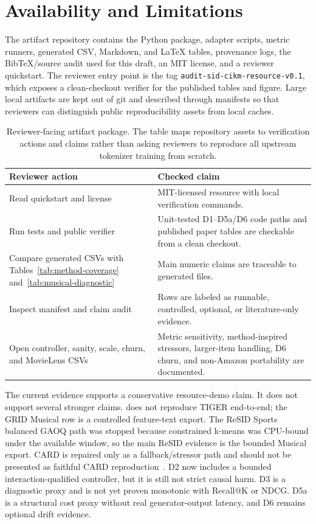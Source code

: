\section{Availability and Limitations}

The artifact repository contains the \tool Python package, adapter scripts,
metric runners, generated CSV, Markdown, and \LaTeX{} tables, provenance logs,
the BibTeX/source audit used for this draft, an MIT license, and a reviewer
quickstart. The reviewer entry point is the tag
\texttt{audit-sid-cikm-resource-v0.1}, which exposes a clean-checkout verifier
for the published tables and figure. Large local artifacts are kept out of git
and described through manifests so that reviewers can distinguish public
reproducibility assets from local caches.

\begin{table}[t]
\caption{Reviewer-facing artifact package. The table maps repository assets to
verification actions and claims rather than asking reviewers to reproduce all
upstream tokenizer training from scratch.}
\label{tab:artifact-package}
\small
\setlength{\tabcolsep}{3pt}
\begin{tabularx}{\columnwidth}{@{}p{}Y@{}}
\toprule
Reviewer action & Checked claim \\
\midrule
Read quickstart and license & MIT-licensed resource with local verification
commands. \\
Run tests and public verifier & Unit-tested D1--D5a/D6 code paths and published
paper tables are checkable from a clean checkout. \\
Compare generated CSVs with Tables~\ref{tab:method-coverage}
and~\ref{tab:musical-diagnostic} & Main numeric claims are traceable to
generated files. \\
Inspect manifest and claim audit & Rows are labeled as runnable, controlled,
optional, or literature-only evidence. \\
Open controller, sanity, scale, churn, and MovieLens CSVs & Metric sensitivity,
method-inspired stressors, larger-item handling, D6 churn, and non-Amazon
portability are documented. \\
\bottomrule
\end{tabularx}
\end{table}

The current evidence supports a conservative resource-demo claim. It does not
support several stronger claims. \tool does not reproduce TIGER end-to-end; the
GRID Musical row is a controlled feature-text export. The ReSID Sports balanced
GAOQ path was stopped because constrained k-means was CPU-bound under the
available window, so the main ReSID evidence is the bounded Musical export.
CARD is repaired only as a fallback/stressor path and should not be presented
as faithful CARD reproduction~\cite{wei2026card}. D2 now includes a bounded
interaction-qualified controller, but it is still not strict causal harm. D3 is
a diagnostic proxy and is not yet proven monotonic with Recall@K or NDCG. D5a
is a structural cost proxy without real generator-output latency, and D6
remains optional drift evidence.

